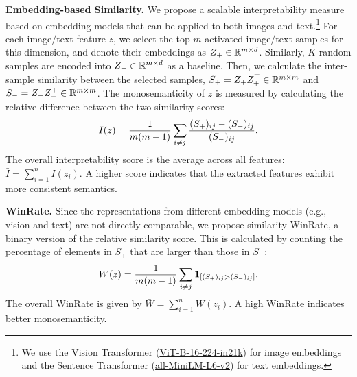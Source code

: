 \textbf{Embedding-based Similarity.} 
We propose a scalable interpretability measure based on embedding models that can be applied to both images and text.\footnote{We use the Vision Transformer (\href{https://huggingface.co/google/vit-base-patch16-224-in21k}{ViT-B-16-224-in21k}) for image embeddings and the Sentence Transformer (\href{https://huggingface.co/sentence-transformers/all-MiniLM-L6-v2}{all-MiniLM-L6-v2}) for text embeddings.} 
For each image/text feature $z$, we select the top $m$ activated image/text samples for this dimension, and denote their embeddings as $Z_+\in{\mathbb{R}}^{m\times d}$. Similarly, $K$ random samples are encoded into $Z_-\in{\mathbb{R}}^{m\times d}$ as a baseline. Then, we calculate the inter-sample similarity between the selected samples, $S_+=Z_+Z_+^\top\in{\mathbb{R}}^{m\times m}$ and $S_-=Z_-Z_-^\top\in{\mathbb{R}}^{m\times m}$. The monosemanticity of $z$ is measured by calculating the relative difference between the two similarity scores: 
\begin{equation}
\small
I(z)=\frac{1}{m(m-1)}\sum_{i\neq j}\frac{(S_+)_{ij}-(S_-)_{ij}}{(S_-)_{ij}}. 
\end{equation}
The overall interpretability score is the average across all features: $\bar I=\sum_{i=1}^nI(z_i)$.
A higher score indicates that the extracted features exhibit more consistent semantics.

\textbf{WinRate.}  
Since the representations from different embedding models (e.g., vision and text) are not directly comparable, we propose similarity WinRate, a binary version of the relative similarity score. This is calculated by counting the percentage of elements in $S_+$ that are larger than those in $S_-$:
\begin{equation}
\small
W(z)=\frac{1}{m(m-1)}\sum_{i\neq j}{\bm{1}}_{[(S_+)_{ij}>(S_-)_{ij}]}. 
\end{equation}
The overall WinRate is given by $\bar W=\sum_{i=1}^nW(z_i)$. 
A high WinRate indicates better monosemanticity.


